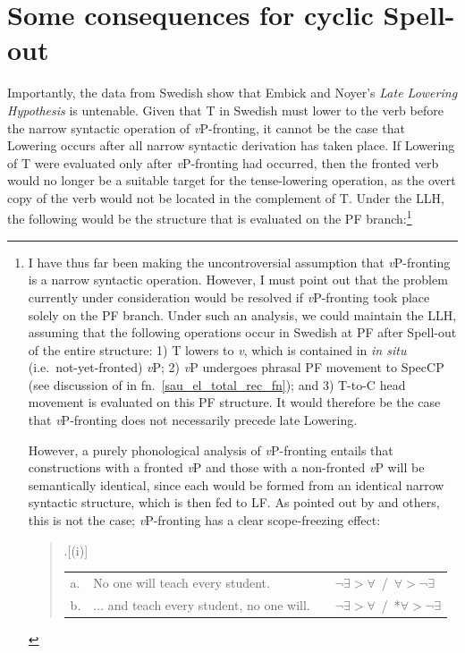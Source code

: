 \section{Some consequences for cyclic Spell-out}\label{conseq_cyclic_spellout}
Importantly, the data from Swedish show that Embick and Noyer's \textit{Late Lowering Hypothesis} is untenable. Given that T in Swedish must lower to the verb before the narrow syntactic operation of \textit{v}P-fronting, it cannot be the case that Lowering occurs after all narrow syntactic derivation has taken place. If Lowering of T were evaluated only after \textit{v}P-fronting had occurred, then the fronted verb would no longer be a suitable target for the tense-lowering operation, as the overt copy of the verb would not be located in the complement of T. Under the LLH, the following would be the structure that is evaluated on the PF branch:\footnote{I have thus far been making the uncontroversial assumption that {\it v}P-fronting is a narrow syntactic operation. However, I must point out that the problem currently under consideration would be resolved if {\it v}P-fronting took place solely on the PF branch. Under such an analysis, we could maintain the LLH, assuming that the following operations occur in Swedish at PF after Spell-out of the entire structure: 1) T lowers to {\it v}, which is contained in {\it in situ} (i.e.\ not-yet-fronted) {\it v}P; 2) {\it v}P undergoes phrasal PF movement to SpecCP (see discussion of \citet{sauerland_elbourne2002} in fn.\ \ref{sau_el_total_rec_fn}); and 3) T-to-C head movement is evaluated on this PF structure. It would therefore be the case that {\it v}P-fronting does not necessarily precede late Lowering.

However, a purely phonological analysis of {\it v}P-fronting entails that constructions with a fronted {\it v}P and those with a non-fronted {\it v}P will be semantically identical, since each would be formed from an identical narrow syntactic structure, which is then fed to LF. As pointed out by \citet{lechner2003} and others, this is not the case; {\it v}P-fronting has a clear scope-freezing effect:
\begin{quote}
\ex.[(i)] \begin{tabular}[t]{llcl}
a. & No one will teach every student. & & $\neg\exists>\forall$~/~$\forall>\neg\exists$\\
b. & $\ldots$ and teach every student, no one will. & & $\neg\exists>\forall$~/~*$\forall>\neg\exists$\\
\end{tabular}


\end{quote}}
